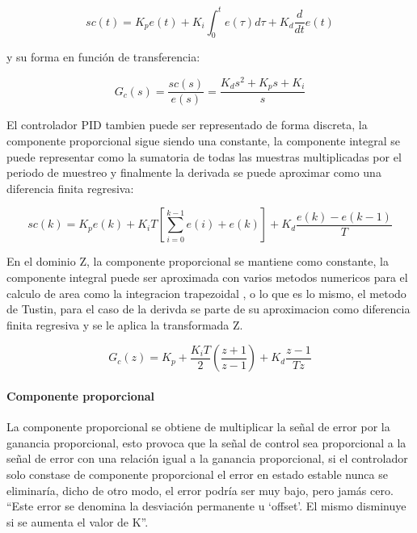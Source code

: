             \begin{equation}\label{eq:pidtiempo}
                sc(t) = K_{p}e(t)+  K_{i}\int_{0}^{t} e(\tau) d\tau + K_{d} \frac{d}{dt}e(t)
            \end{equation}
            
            \noindent y su forma en función de transferencia:
            
            \begin{equation}\label{eq:pidcompleja}
                G_{c}(s) = \frac{sc(s)}{e(s)} = \frac{K_{d}s^{2} + K_{p}s +  K_{i}}{s}
            \end{equation}
            
            El controlador PID tambien puede ser representado de forma discreta, la componente proporcional sigue siendo una constante, la componente integral se puede representar como la sumatoria de todas las muestras multiplicadas por el periodo de muestreo y finalmente la derivada se puede aproximar como una diferencia finita regresiva:

            \begin{equation}\label{eq:pidcdiscreto}
                sc(k) = K_{p}e(k)+  K_{i}T\left[\sum_{i=0}^{k-1} e(i) + e(k)\right] + K_{d} \frac{e(k)- e(k-1)}{T}
            \end{equation}

            En el dominio Z, la componente proporcional se mantiene como constante, la componente integral puede ser aproximada con varios metodos numericos para el calculo de area como la integracion trapezoidal \Parencite{kuo1996sistemas}, o lo que es lo mismo, el metodo de Tustin, para el caso de la derivda se parte de su aproximacion como diferencia finita regresiva y se le aplica la transformada Z.

            \begin{equation}\label{eq:pidenZ}
                G_{c}(z) = K_{p} + \frac{K_{i}T}{2}\left(\frac{z+1}{z-1}\right) + K_{d} \frac{z-1}{Tz}
            \end{equation}

            \paragraph{Componente proporcional}

				La componente proporcional se obtiene de multiplicar la señal de error por la ganancia proporcional, esto provoca que la señal de control sea proporcional a la señal de error con una relación igual a la ganancia proporcional, si el controlador solo constase de componente proporcional el error en estado estable nunca se eliminaría, dicho de otro modo, el error podría ser muy bajo, pero jamás cero. \enquote{Este error se denomina la desviación permanente u \enquote{offset}. El mismo disminuye si se aumenta el valor de K}\Parencite[p.$\,$54]{nelson1999fundamentos}.

